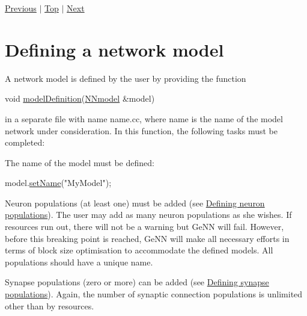  \hyperlink{ReleaseNotes}{Previous} $\vert$ \hyperlink{UserManual}{Top} $\vert$ \hyperlink{sect1}{Next} \hypertarget{sect1}{}\section{Defining a network model}\label{sect1}
A network model is defined by the user by providing the function 
\begin{DoxyCode}
\textcolor{keywordtype}{void} \hyperlink{tmp_2model_2MBody__userdef_8cc_a9aeaa0a22980484b2c472564fc9f686e}{modelDefinition}(\hyperlink{classNNmodel}{NNmodel} &model) 
\end{DoxyCode}
 in a separate file with name {\ttfamily name.\+cc}, where {\ttfamily name} is the name of the model network under consideration. In this function, the following tasks must be completed\+:
\begin{DoxyEnumerate}
\item The name of the model must be defined\+: 
\begin{DoxyCode}
model.\hyperlink{classNNmodel_a757eff2a5877688e6e5492726df035ee}{setName}(\textcolor{stringliteral}{"MyModel"});
\end{DoxyCode}

\item Neuron populations (at least one) must be added (see \hyperlink{sect1_subsect11}{Defining neuron populations}). The user may add as many neuron populations as she wishes. If resources run out, there will not be a warning but Ge\+N\+N will fail. However, before this breaking point is reached, Ge\+N\+N will make all necessary efforts in terms of block size optimisation to accommodate the defined models. All populations should have a unique name.
\item Synapse populations (zero or more) can be added (see \hyperlink{sect1_subsect12}{Defining synapse populations}). Again, the number of synaptic connection populations is unlimited other than by resources.
\end{DoxyEnumerate}

